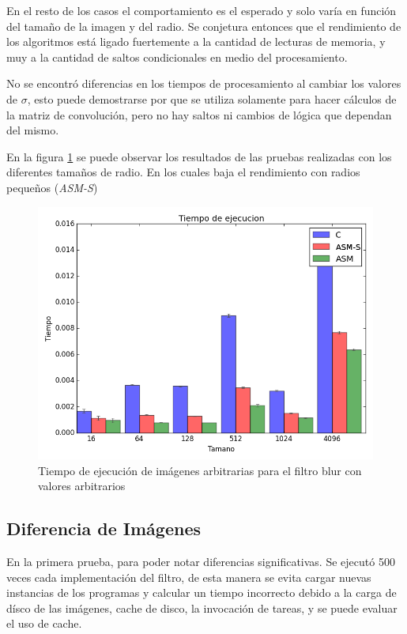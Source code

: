 En el resto de los casos el comportamiento es el esperado y solo var\'ia en funci\'on del tamaño de la imagen y del radio. Se conjetura entonces que el rendimiento de los algoritmos est\'a ligado fuertemente a la cantidad de lecturas de memoria, y muy a la cantidad de saltos condicionales en medio del procesamiento.

No se encontr\'o diferencias en los tiempos de procesamiento al cambiar los valores de $\sigma$, esto puede demostrarse por que se utiliza solamente para hacer c\'alculos de la matriz de convoluci\'on, pero no hay saltos ni cambios de l\'ogica que dependan del mismo.

En la figura \ref{fig:figure_blur} se puede observar los resultados de las pruebas realizadas con los diferentes tama\~nos de radio. En los cuales baja el rendimiento con radios peque\~nos (\emph{ASM-S})

\begin{figure}[htpb]
    \centering
    \caption{Tiempo de ejecuci\'on de im\'agenes arbitrarias para el filtro blur con valores arbitrarios }
    \label{fig:figure_blur}
    \includegraphics[width=0.75\columnwidth]{include/figure_blur}
\end{figure}

\FloatBarrier
\subsection{Diferencia de Im\'agenes}

En la primera prueba, para poder notar diferencias significativas. Se ejecut\'o 500 veces cada implementaci\'on del filtro, de esta manera se evita cargar nuevas instancias de los programas y calcular un tiempo incorrecto debido a la carga de d\'isco de las im\'agenes, cache de disco, la invocaci\'on de tareas, y se puede evaluar el uso de cache.

